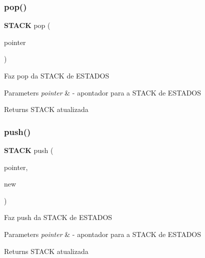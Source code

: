 \subsubsection{pop()}
{\footnotesize\ttfamily \textbf{ S\+T\+A\+CK} pop (\begin{DoxyParamCaption}\item[{\textbf{ S\+T\+A\+CK}}]{pointer }\end{DoxyParamCaption})}

Faz pop da S\+T\+A\+CK de E\+S\+T\+A\+D\+OS 
\begin{DoxyParams}{Parameters}
{\em pointer} & -\/ apontador para a S\+T\+A\+CK de E\+S\+T\+A\+D\+OS \\
\hline
\end{DoxyParams}
\begin{DoxyReturn}{Returns}
S\+T\+A\+CK atualizada 
\end{DoxyReturn}
\mbox{\label{stack_8h_a8af8b53dd4115ebf6576c3fbd991bd73}} 
\subsubsection{push()}
{\footnotesize\ttfamily \textbf{ S\+T\+A\+CK} push (\begin{DoxyParamCaption}\item[{\textbf{ S\+T\+A\+CK}}]{pointer,  }\item[{\textbf{ E\+S\+T\+A\+DO}}]{new }\end{DoxyParamCaption})}

Faz push da S\+T\+A\+CK de E\+S\+T\+A\+D\+OS 
\begin{DoxyParams}{Parameters}
{\em pointer} & -\/ apontador para a S\+T\+A\+CK de E\+S\+T\+A\+D\+OS \\
\hline
\end{DoxyParams}
\begin{DoxyReturn}{Returns}
S\+T\+A\+CK atualizada 
\end{DoxyReturn}
